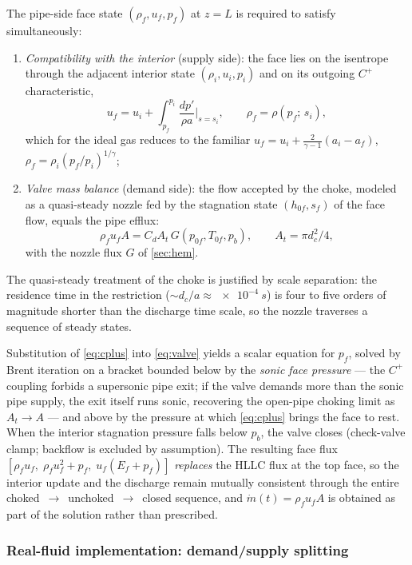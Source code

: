 \documentclass[11pt]{article}
\newcommand{\mdot}{\dot{m}}
\begin{document}
The pipe-side face state $(\rho_f, u_f, p_f)$ at $z=L$ is required to
satisfy simultaneously:
\begin{enumerate}
\item \emph{Compatibility with the interior} (supply side): the face
lies on the isentrope through the adjacent interior state
$(\rho_i, u_i, p_i)$ and on its outgoing $C^{+}$ characteristic,
\begin{equation}
u_f = u_i + \int_{p_f}^{p_i}\frac{dp'}{\rho a}\bigg|_{s=s_i},
\qquad \rho_f = \rho(p_f;\,s_i),
\label{eq:cplus}
\end{equation}
which for the ideal gas reduces to the familiar
$u_f = u_i + \tfrac{2}{\gamma-1}(a_i - a_f)$,
$\rho_f = \rho_i (p_f/p_i)^{1/\gamma}$;
\item \emph{Valve mass balance} (demand side): the flow accepted by
the choke, modeled as a quasi-steady nozzle fed by the stagnation
state $(h_{0f}, s_f)$ of the face flow, equals the pipe efflux:
\begin{equation}
\rho_f u_f A = C_d A_t\, G\!\left(p_{0f}, T_{0f}, p_b\right),
\qquad A_t = \pi d_c^2/4,
\label{eq:valve}
\end{equation}
with the nozzle flux $G$ of \cref{sec:hem}.
\end{enumerate}
The quasi-steady treatment of the choke is justified by scale
separation: the residence time in the restriction
($\sim d_c/a \approx \SI{e-4}{s}$) is four to five orders of magnitude
shorter than the discharge time scale, so the nozzle traverses a
sequence of steady states.

Substitution of \cref{eq:cplus} into \cref{eq:valve} yields a scalar
equation for $p_f$, solved by Brent iteration on a bracket bounded
below by the \emph{sonic face pressure} --- the $C^{+}$ coupling
forbids a supersonic pipe exit; if the valve demands more than the
sonic pipe supply, the exit itself runs sonic, recovering the
open-pipe choking limit as $A_t \to A$ --- and above by the pressure
at which \cref{eq:cplus} brings the face to rest. When the interior
stagnation pressure falls below $p_b$, the valve closes (check-valve
clamp; backflow is excluded by assumption). The resulting face flux
$[\rho_f u_f,\; \rho_f u_f^2 + p_f,\; u_f(E_f + p_f)]$ \emph{replaces}
the HLLC flux at the top face, so the interior update and the
discharge remain mutually consistent through the entire
choked~$\to$~unchoked~$\to$~closed sequence, and
$\mdot(t) = \rho_f u_f A$ is obtained as part of the solution rather
than prescribed.

\subsubsection{Real-fluid implementation: demand/supply splitting}
\label{sec:split}
\end{document}
